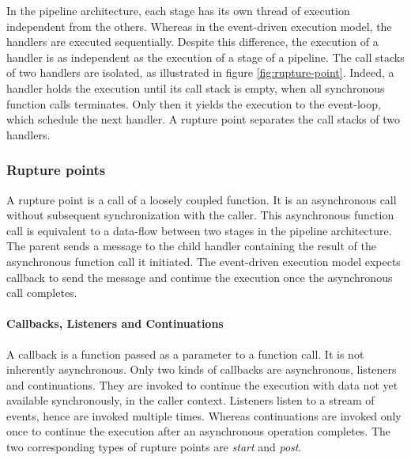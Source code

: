 In the pipeline architecture, each stage has its own thread of execution independent from the others.
Whereas in the event-driven execution model, the handlers are executed sequentially.
Despite this difference, the execution of a handler is as independent as the execution of a stage of a pipeline.
The call stacks of two handlers are isolated, as illustrated in figure \ref{fig:rupture-point}.
Indeed, a handler holds the execution until its call stack is empty, when all synchronous function calls terminates. Only then it yields the execution to the event-loop, which schedule the next handler.
A rupture point separates the call stacks of two handlers.



\subsubsection{Rupture points} \label{chapter5:flx-compiler:analyzer:rupture}

A rupture point is a call of a loosely coupled function.
It is an asynchronous call without subsequent synchronization with the caller.
This asynchronous function call is equivalent to a data-flow between two stages in the pipeline architecture.
The parent sends a message to the child handler containing the result of the asynchronous function call it initiated.
The event-driven execution model expects callback to send the message and continue the execution once the asynchronous call completes.

\paragraph{Callbacks, Listeners and Continuations}

A callback is a function passed as a parameter to a function call.
It is not inherently asynchronous.
Only two kinds of callbacks are asynchronous, listeners and continuations.
They are invoked to continue the execution with data not yet available synchronously, in the caller context.
Listeners listen to a stream of events, hence are invoked multiple times.
Whereas continuations are invoked only once to continue the execution after an asynchronous operation completes.
The two corresponding types of rupture points are \textit{start} and \textit{post}.

